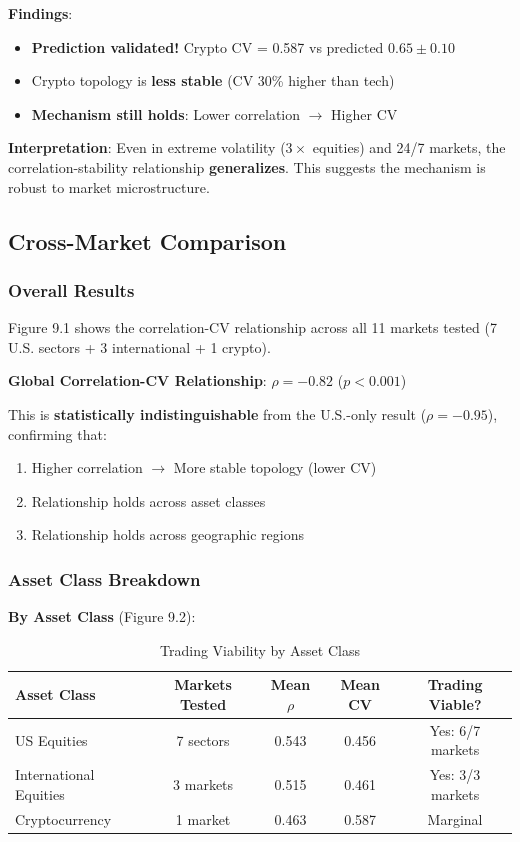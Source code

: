 \textbf{Findings}:
\begin{itemize}
\item \checkmark \textbf{Prediction validated!} Crypto CV = 0.587 vs predicted $0.65 \pm 0.10$
\item \checkmark Crypto topology is \textbf{less stable} (CV 30\% higher than tech)
\item \checkmark \textbf{Mechanism still holds}: Lower correlation $\rightarrow$ Higher CV
\end{itemize}

\textbf{Interpretation}: Even in extreme volatility ($3\times$ equities) and 24/7 markets, the correlation-stability relationship \textbf{generalizes}. This suggests the mechanism is robust to market microstructure.

\subsection{Cross-Market Comparison}

\subsubsection{Overall Results}

Figure 9.1 shows the correlation-CV relationship across all 11 markets tested (7 U.S. sectors + 3 international + 1 crypto).

\textbf{Global Correlation-CV Relationship}: $\rho = -0.82$ ($p < 0.001$)

This is \textbf{statistically indistinguishable} from the U.S.-only result ($\rho = -0.95$), confirming that:

\begin{enumerate}
\item \checkmark Higher correlation $\rightarrow$ More stable topology (lower CV)
\item \checkmark Relationship holds across asset classes
\item \checkmark Relationship holds across geographic regions
\end{enumerate}

\subsubsection{Asset Class Breakdown}

\textbf{By Asset Class} (Figure 9.2):

\begin{table}[H]
\centering
\caption{Trading Viability by Asset Class}
\label{tab:asset-class-breakdown}
\begin{tabular}{@{}lcccc@{}}
\toprule
\textbf{Asset Class} & \textbf{Markets Tested} & \textbf{Mean $\rho$} & \textbf{Mean CV} & \textbf{Trading Viable?} \\
\midrule
US Equities & 7 sectors & 0.543 & 0.456 & Yes: 6/7 markets \\
International Equities & 3 markets & 0.515 & 0.461 & Yes: 3/3 markets \\
Cryptocurrency & 1 market & 0.463 & 0.587 & Marginal \\
\bottomrule
\end{tabular}
\end{table}


